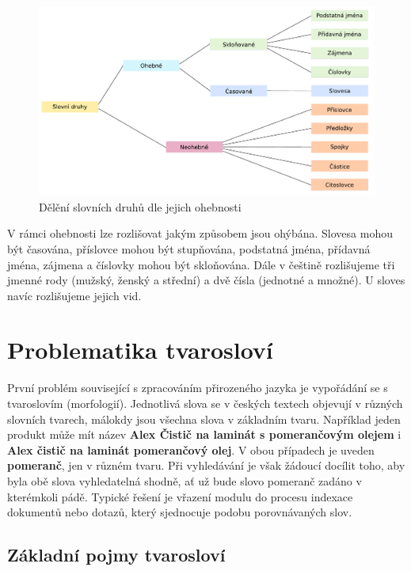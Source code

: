 \documentclass[FM,DP]{tulthesis}
\begin{document}
\begin{figure}[h]
\center
\includegraphics[width=\textwidth]{slovni-druhy.pdf}
\caption{Dělění slovních druhů dle jejich ohebnosti}
\label{slovni-druhy}
\end{figure}

V rámci ohebnosti lze rozlišovat jakým způsobem jsou ohýbána. Slovesa mohou být
časována, příslovce mohou být stupňována, podstatná jména, přídavná jména, zájmena
a číslovky mohou být skloňována. Dále v češtině rozlišujeme tři jmenné rody
(mužský, ženský a střední) a dvě čísla (jednotné a množné). U sloves navíc 
rozlišujeme jejich vid.

\section{Problematika tvarosloví}

První problém související s zpracováním přirozeného jazyka je vypořádání se s tvaroslovím
(morfologií). Jednotlivá slova se v českých textech objevují v různých slovních tvarech, 
málokdy jsou všechna slova v základním tvaru. Například jeden produkt může mít název
\textbf{Alex Čistič na laminát s pomerančovým olejem} i \textbf{Alex čistič na laminát pomerančový olej}.
V obou případech je uveden \textbf{pomeranč}, jen v různém tvaru. Při vyhledávání je však
žádoucí docílit toho, aby byla obě slova vyhledatelná shodně, ať už bude slovo pomeranč
zadáno v kterémkoli pádě. Typické řešení je vřazení modulu do procesu indexace dokumentů nebo 
dotazů, který sjednocuje podobu porovnávaných slov.

\subsection{Základní pojmy tvarosloví}
\end{document}
